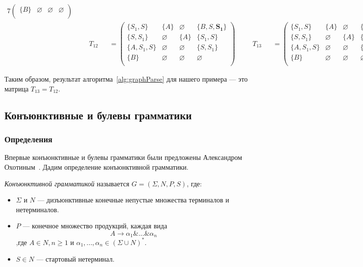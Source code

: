 \begin{example}
\begin{alignat*}{7}
\begin{pmatrix}
\{B\}       & \varnothing & \varnothing & \varnothing \\
\end{pmatrix} \\ & &&T_{12} &&= \begin{pmatrix}
\{S_1, S\}     & \{A\}       & \varnothing & \{B, S, \pmb{S_1}\}    \\
\{S, S_1\}       & \varnothing & \{A\}       & \{S_1, S\}     \\
\{A, S_1, S\}  & \varnothing & \varnothing & \{S, S_1\} \\
\{B\}       & \varnothing & \varnothing & \varnothing \\
\end{pmatrix} \ \ \ \ &&T_{13} &&= \begin{pmatrix}
\{S_1, S\}     & \{A\}       & \varnothing & \{B, S, S_1\}    \\
\{S, S_1\}       & \varnothing & \{A\}       & \{S_1, S\}     \\
\{A, S_1, S\}  & \varnothing & \varnothing & \{S, S_1\} \\
\{B\}       & \varnothing & \varnothing & \varnothing \\
\end{pmatrix}
\end{alignat*}

Таким образом, результат алгоритма~\ref{alg:graphParse} для нашего примера --- это матрица $T_{13} = T_{12}$. 

\end{example}

\subsection{Конъюнктивные и булевы грамматики}

\subsubsection{Определения}

Впервые конъюнктивные и булевы грамматики были предложены Александром Охотиным~\cite{DBLP:journals/jalc/Okhotin01,Okhotin:2003:BG:1758089.1758123}. Дадим определение конъюнктивной грамматики.

\begin{definition}
	\textit{Конъюнктивной грамматикой} называется $G = (\Sigma,N,P,S)$, где:
	\begin{itemize}
		\item $\Sigma$ и $N$ --- дизъюнктивные конечные непустые множества терминалов и нетерминалов.
		\item $P$ --- конечное множество продукций, каждая вида
		\[
		A\rightarrow \alpha_1\&...\&\alpha_n
		\]
		,где $A \in N,n \geq 1$ и $\alpha_1,...,\alpha_n \in (\Sigma \cup N)^*$.
		\item $S \in N$  --- стартовый нетерминал.
	\end{itemize}
\end{definition}

